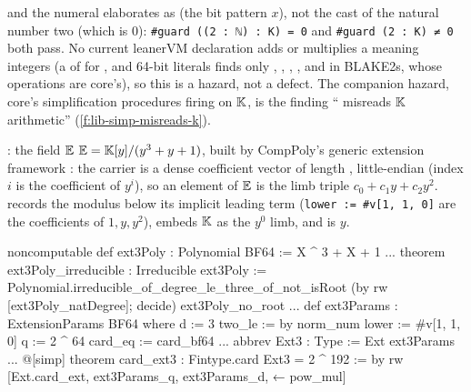 
and the numeral  elaborates as  (the bit pattern $x$),
not the cast of the natural number two (which is $0$): \texttt{\#guard ((2 : ℕ) : K) = 0} and
\texttt{\#guard (2 : K) ≠ 0} both pass. No current leanerVM declaration adds or multiplies a
 meaning integers (a  of  for ,
 and 64-bit literals finds only , ,
\lean{++}, \lean{<<<}, and  in BLAKE2s, whose operations are core's), so this is a
hazard, not a defect. The companion hazard, core's  simplification procedures firing
on $\mathbb{K}$, is the finding \enquote{ misreads $\mathbb{K}$ arithmetic}
(\cref{f:lib-simp-misreads-k}).

\begin{define}{: the field $\mathbb{E}$}
$\mathbb{E} = \mathbb{K}[y]/(y^3 + y + 1)$, built by CompPoly's generic extension framework : the
carrier is a dense coefficient vector of length , little-endian (index $i$ is the
coefficient of $y^i$), so an element of $\mathbb{E}$ is the limb triple $c_0 + c_1 y + c_2 y^2$.
 records the modulus below its implicit leading term (\texttt{lower := \#v[1, 1, 0]}
are the coefficients of $1, y, y^2$),  embeds $\mathbb{K}$ as the $y^0$ limb, and
 is $y$.
\end{define}

\begin{leancode}
noncomputable def ext3Poly : Polynomial BF64 := X ^ 3 + X + 1
...
theorem ext3Poly_irreducible : Irreducible ext3Poly :=
  Polynomial.irreducible_of_degree_le_three_of_not_isRoot
    (by rw [ext3Poly_natDegree]; decide) ext3Poly_no_root
...
def ext3Params : ExtensionParams BF64 where
  d := 3
  two_le := by norm_num
  lower := #v[1, 1, 0]
  q := 2 ^ 64
  card_eq := card_bf64
...
abbrev Ext3 : Type := Ext ext3Params
...
@[simp] theorem card_ext3 : Fintype.card Ext3 = 2 ^ 192 := by
  rw [Ext.card_ext, ext3Params_q, ext3Params_d, ← pow_mul]
\end{leancode}

